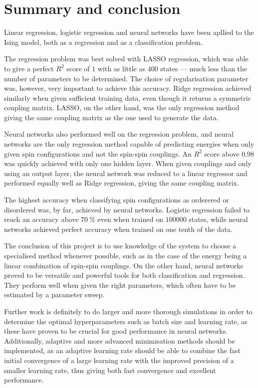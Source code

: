 \documentclass[11pt,british,a4paper]{article}
\numberwithin{equation}{section}
\begin{document}
\section{Summary and conclusion}
Linear regression, logistic regression and neural networks have been apllied to the Ising model, both as a regression and as a classification problem.

The regression problem was best solved with LASSO regression, which was able to give a perfect \(R^2\) score of \(1\) with as little as \(400\) states --- much less than the number of parameters to be determined. The choice of regularisation parameter was, however, very important to achieve this accuracy. Ridge regression achieved similarly when given sufficient training data, even though it returns a symmetric coupling matrix. LASSO, on the other hand, was the only regression method giving the same coupling matrix as the one used to generate the data.

Neural networks also performed well on the regression problem, and neural networks are the only regression method capable of predicting energies when only given spin configurations and not the spin-spin couplings. An \(R^2\) score above \(\num{0.98}\) was quickly achieved with only one hidden layer. When given couplings and only using an output layer, the neural network was reduced to a linear regressor and performed equally well as Ridge regression, giving the same coupling matrix.

The highest accuracy when classifying spin configurations as orderered or disordered was, by far, achieved by neural networks. Logistic regression failed to reach an accuracy above \(\SI{70}{\percent}\) even when trained on \(\num{100000}\) states, while neural networks achieved perfect accuracy when trained on one tenth of the data.

The conclusion of this project is to use knowledge of the system to choose a specialised method whenever possible, such as in the case of the energy being a linear combination of spin-spin couplings. On the other hand, neural networks proved to be versatile and powerful tools for both classification and regression. They perform well when given the right parameters, which often have to be estimated by a parameter sweep.

Further work is definitely to do larger and more thorough simulations in order to determine the optimal hyperparameters such as batch size and learning rate, as these have proven to be crucial for good performance in neural networks. Additionally, adaptive and more advanced minimisation methods should be implemented, as an adaptive learning rate should be able to combine the fast initial convergence of a large learning rate with the improved precision of a smaller learning rate, thus giving both fast convergence and excellent performance.
\end{document}
